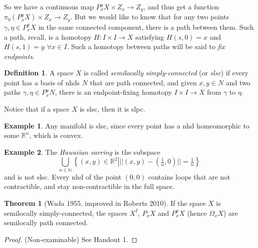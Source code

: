 \documentclass{tufte-handout}
\def\RR{\mathbb{R}}
\theoremstyle{definition}
\newtheorem{definition}{Definition}
\newtheorem{example}{Example}
\newtheorem{theorem}{Theorem}
\begin{document}
So we have a continuous map $P_x^y X\times Z_x \to Z_y$, and thus get a function $\pi_0(P_x^yX) \times Z_x \to Z_y$.
But we would like to know that for any two points $\gamma,\eta\in P_x^yX$ in the same connected component, there is a path between them.
Such a path, recall, is a homotopy $H\colon I \times I \to X$ satisfying $H(s,0)=x$ and $H(s,1)=y$ $\forall x\in I$. Such a homotopy between paths will be said to \emph{fix endpoints}.


\begin{definition}
A space $X$ is called \emph{semilocally simply-connected}
 (or \emph{slsc}) if every point has a basis of nhds $N$ that are path connected, and given 
$x,y\in N$ and two paths $\gamma,\eta \in P_x^y N$, there is an endpoint-fixing homotopy 
$I\times I \to X$ from $\gamma$ to $\eta$.
\end{definition}

Notice that if a space $X$ is slsc, then it is slpc.

\begin{example}
Any manifold is slsc, since every point has a nhd homeomorphic to some $\RR^n$, 
which is convex.
\end{example}

\begin{example}
The \emph{Hawaiian earring} is the subspace 
\[
	\bigcup_{n\in \mathbb{N}} \left\{(x,y)\in \RR^2 \left| 
			||(x,y) - (\tfrac1n,0)|| = \tfrac1n\right.\right\}
\]
and is not slsc. Every nhd of the point $(0,0)$ contains loops that are not contractible, and
stay non-contractible in the full space.
\end{example}


\begin{theorem}[Wada 1955, improved in Roberts 2010]
If 
the space $X$ is semilocally simply-connected, 
the spaces $X^I$, $P_xX$ and $P_x^yX$ (hence $\Omega_xX$) are semilocally path connected.
\end{theorem}

\begin{proof}(Non-examinable)
See Handout 1.
\end{proof}
\end{document}
